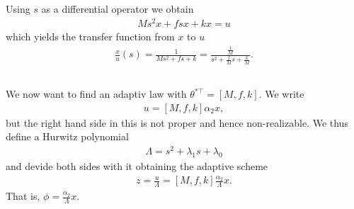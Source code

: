 \documentclass[]{article}
\begin{document}
\subsection{}
Using $s$ as a differential operator we obtain
 \begin{equation}\begin{aligned}
Ms^2x + fsx + kx = u
\end{aligned}\end{equation}
which yields the transfer function from $x$ to $u$
\begin{equation}\begin{aligned}
\frac{x}{u}(s) = \frac{1}{Ms^2 + fs + k} = \frac{\frac{1}{M}}{s^2 + \frac{f}{M}s + \frac{k}{M}}.
\end{aligned}\end{equation}

\subsection{}
We now want to find an adaptiv law with $\theta^{*\top} = [M, f, k]$. We write
\begin{equation}\begin{aligned}
u = [M, f, k]\alpha_2 x,
\end{aligned}\end{equation}
but the right hand side in this is not proper and hence non-realizable. We thus define a Hurwitz polynomial
\begin{equation}\begin{aligned}
\Lambda = s^2 + \lambda_1 s + \lambda_0
\end{aligned}\end{equation}
and devide both sides with it obtaining the adaptive scheme
\begin{equation}\begin{aligned}
z = \frac{u}{\Lambda} = [M, f, k] \frac{\alpha_2}{\Lambda}x.
\end{aligned}\end{equation}
That is, $\phi = \frac{\alpha_2}{\Lambda}x$.

\section{}
\end{document}

